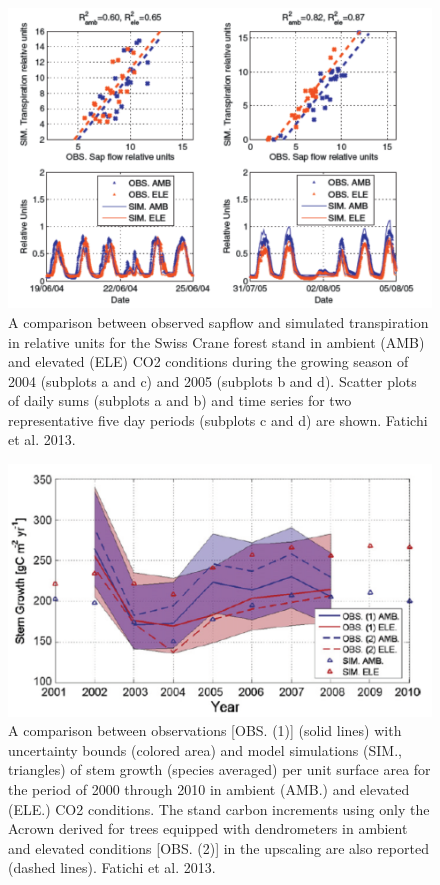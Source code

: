 \documentclass[12pt,oneside]{book}
\begin{document}
\begin{figure}

{\centering \includegraphics[width=0.8\linewidth]{figures/chap5/f511_fatichi_sf} 

}

\caption{A comparison between observed sapflow and simulated transpiration in relative units for the Swiss Crane forest stand in ambient (AMB) and elevated (ELE) CO2 conditions during the growing season of 2004 (subplots a and c) and 2005 (subplots b and d). Scatter plots of daily sums (subplots a and b) and time series for two representative five day periods (subplots c and d) are shown. Fatichi et al. 2013.}\label{fig:f511}
\end{figure}

\begin{figure}

{\centering \includegraphics[width=0.8\linewidth]{figures/chap5/f512_fatichi_growth} 

}

\caption{A comparison between observations [OBS. (1)] (solid lines) with uncertainty bounds (colored area) and model simulations (SIM., triangles) of stem growth (species averaged) per unit surface area for the period of 2000 through 2010 in ambient (AMB.) and elevated (ELE.) CO2 conditions. The stand carbon increments using only the Acrown derived for trees equipped with dendrometers in ambient and elevated conditions [OBS. (2)] in the upscaling are also reported (dashed lines). Fatichi et al. 2013.}\label{fig:f512}
\end{figure}
\end{document}
